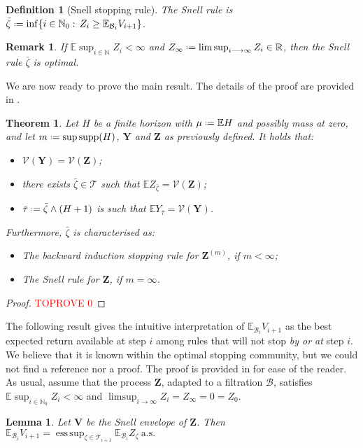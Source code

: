 \documentclass[11pt, a4paper, twoside]{article}
\newcommand*{\defeq}{\mathrel{\vcenter{\baselineskip0.5ex \lineskiplimit0pt
			\hbox{\scriptsize.}\hbox{\scriptsize.}}}=}
\newcommand{\ssup}[1]{{\scriptscriptstyle{({#1})}}}
\newcommand{\NN}{\mathbb{N}}
\newcommand{\RR}{\mathbb{R}}
\newcommand{\EE}{\mathbb{E}}
\newcommand{\TT}{\mathcal{T}}
\newcommand{\Val}{\mathcal{V}}
\newcommand{\YY}{\mathbf{Y}}
\newcommand{\VV}{\mathbf{V}}
\newcommand{\DZ}{\mathbf{Z}}
\newcommand{\DF}{\mathcal{B}}
\newcommand{\as}{\:\text{a.s.}}
\DeclareMathOperator*{\esup}{ess\,sup} \DeclareMathOperator{\supp}{supp}
\newtheorem{theorem}{Theorem}[section]
\newtheorem{lemma}{Lemma}[section]
\newtheorem{remark}{Remark}[section]
\newtheorem{definition}{Definition}[section]
\numberwithin{equation}{section}
\begin{document}
	\begin{definition}[Snell stopping rule]\label{snellstoprule}
		The \emph{Snell rule} is $\bar{\zeta}\defeq\inf\{i\in\NN_0:\,Z_i\ge \EE_{\DF_i}V_{i+1}\}$.
	\end{definition}
	\begin{remark}\label{snellstop}
		If $\EE \sup_{i\in\NN} Z_i<\infty$ and $Z_\infty\defeq \limsup_{i\longrightarrow\infty} Z_i\in\RR$, then the \emph{Snell rule} $\bar{\zeta}$ is optimal.
	\end{remark}
	We are now ready to prove the main result. The details of the proof are provided in .
	\begin{theorem}\label{optalg}
		Let $H$ be a finite horizon with $\mu\defeq\EE H$ and possibly mass at zero, and let $m\defeq\sup \supp(H)$, $\YY$ and $\DZ$ as previously defined. It holds that:
		\begin{itemize}[noitemsep]
			\item$\Val(\YY) = \Val(\DZ)$; 
			\item there exists $\bar{\zeta}\in\TT$ such that $\EE Z_{\bar{\zeta}} = \Val (\DZ)$;
			\item $\bar{\tau}\defeq \bar{\zeta}\wedge (H+1)$ is such that $\EE Y_{\bar{\tau}} = \Val(\YY)$.
		\end{itemize}
		Furthermore, $\bar{\zeta}$ is characterised as:
		\begin{itemize}[noitemsep]
			\item The \emph{backward induction stopping rule} for $\DZ^\ssup{m}$, if $m<\infty$;
			\item The \emph{Snell rule} for $\DZ$, if $m=\infty$.
		\end{itemize}
	\end{theorem}
        	\begin{proof}\textcolor{red}{TOPROVE 0}\end{proof}
	
	The following result gives the intuitive interpretation of $\EE_{\DF_i}V_{i+1}$ as the best expected return available at step $i$ among rules that will not stop \textit{by or at} step $i$. We believe that it is known within the optimal stopping community, but we could not find a reference nor a proof. The proof is provided in  for ease of the reader. As usual, assume that the process $\DZ$, adapted to a filtration $\DF$, satisfies $\EE\sup_{i\in\NN_0}Z_i<\infty$ and $\limsup_{i\longrightarrow\infty}Z_i=Z_\infty=0=Z_0$.
	\begin{lemma}\label{snellfuture}
		Let $\VV$ be the Snell envelope of $\DZ$. Then
		$\EE_{\DF_i}V_{i+1}=\esup_{\zeta\in\TT_{i+1}}\EE_{\DF_i}Z_\zeta \as$
	\end{lemma}
	
\end{document}
